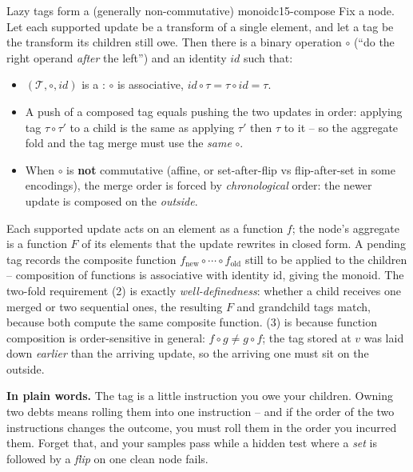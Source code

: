 \begin{theorem}{Lazy tags form a (generally non-commutative) monoid}{c15-compose}
Fix a node.  Let each supported update be a transform of a single element, and let a tag be the transform its children still owe.  Then there is a binary operation \(\circ\) (``do the right operand \emph{after} the left'') and an identity \(\mathit{id}\) such that:
\begin{itemize}[nosep,leftmargin=1.4em]
  \item \((\mathcal{T},\circ,\mathit{id})\) is a : \(\circ\) is associative, \(\mathit{id}\circ\tau=\tau\circ\mathit{id}=\tau\).
  \item A push of a composed tag equals pushing the two updates in order: applying tag \(\tau\circ\tau'\) to a child is the same as applying \(\tau'\) then \(\tau\) to it -- so the aggregate fold and the tag merge must use the \emph{same} \(\circ\).
  \item When \(\circ\) is \textbf{not} commutative (affine, or set-after-flip vs flip-after-set in some encodings), the merge order is forced by \emph{chronological} order: the newer update is composed on the \emph{outside}.
\end{itemize}
\end{theorem}
\begin{proofbox}
Each supported update acts on an element as a function \(f\); the node's aggregate is a function \(F\) of its elements that the update rewrites in closed form.  A pending tag records the composite function \(f_{\text{new}}\circ\cdots\circ f_{\text{old}}\) still to be applied to the children -- composition of functions is associative with identity \(\mathrm{id}\), giving the monoid.  The two-fold requirement (2) is exactly \emph{well-definedness}: whether a child receives one merged  or two sequential ones, the resulting \(F\) and grandchild tags match, because both compute the same composite function.  (3) is because function composition is order-sensitive in general: \(f\circ g\neq g\circ f\); the tag stored at \(v\) was laid down \emph{earlier} than the arriving update, so the arriving one must sit on the outside.
\end{proofbox}

\noindent\textbf{In plain words.}  The tag is a little instruction you owe your children.  Owning two debts means rolling them into one instruction -- and if the order of the two instructions changes the outcome, you must roll them in the order you incurred them.  Forget that, and your samples pass while a hidden test where a \emph{set} is followed by a \emph{flip} on one clean node fails.

